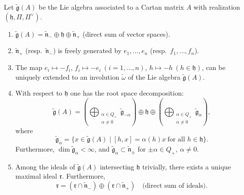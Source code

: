 \documentclass[12pt]{article}
\begin{document}
\begin{theorem}\label{thm:universal-lie-alg}
    Let $\tilde {\mathfrak{g}}(A)$ be the Lie algebra associated to a Cartan matrix $A$ with realization $(\mathfrak{h}, \Pi, \Pi^\vee)$.
    \begin{enumerate}[label=\alph*)]
        \item $\tilde{\mathfrak{g}}(A) = \tilde{\mathfrak{n}}_- \oplus \mathfrak{h} \oplus \tilde{\mathfrak{n}}_+$ \quad (direct sum of vector spaces).

        \item $\tilde{\mathfrak{n}}_+$ (resp.\ $\tilde{\mathfrak{n}}_-$) is freely generated by $e_1,\dots,e_n$ (resp.\ $f_1,\dots,f_n$).

        \item The map $e_i \mapsto -f_i$, $f_i \mapsto -e_i \ (i=1,\dots,n)$,
              $h \mapsto -h \ (h\in\mathfrak{h})$, can be uniquely extended to an involution
              $\tilde{\omega}$ of the Lie algebra $\tilde{\mathfrak{g}}(A)$.

        \item With respect to $\mathfrak{h}$ one has the root space decomposition:
              \[
                  \tilde{\mathfrak{g}}(A)
                  = \left( \bigoplus_{\substack{\alpha \in Q_+ \\ \alpha \neq 0}}
                  \tilde{\mathfrak{g}}_{-\alpha} \right)
                  \oplus \mathfrak{h}
                  \oplus \left( \bigoplus_{\substack{\alpha \in Q_+ \\ \alpha \neq 0}}
                  \tilde{\mathfrak{g}}_{\alpha} \right),
              \]
              where
              \[
                  \tilde{\mathfrak{g}}_{\alpha} = \{ x \in \tilde{\mathfrak{g}}(A) \mid [h,x] = \alpha(h)x
                  \ \text{for all } h \in \mathfrak{h} \}.
              \]
              Furthermore, $\dim \tilde{\mathfrak{g}}_{\alpha} < \infty$, and
              $\tilde{\mathfrak{g}}_{\alpha} \subset \tilde{\mathfrak{n}}_\pm$
              for $\pm\alpha \in Q_+, \ \alpha \neq 0$.

        \item Among the ideals of $\tilde{\mathfrak{g}}(A)$ intersecting $\mathfrak{h}$ trivially,
              there exists a unique maximal ideal $\mathfrak{r}$. Furthermore,
              \[
                  \mathfrak{r}
                  = (\mathfrak{r} \cap \tilde{\mathfrak{n}}_-) \oplus (\mathfrak{r} \cap \tilde{\mathfrak{n}}_+)
                  \quad \text{(direct sum of ideals)}.
              \]
    \end{enumerate}
\end{theorem}
\end{document}
